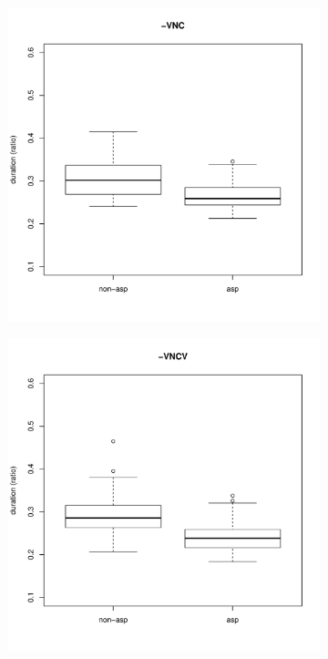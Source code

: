 \documentclass[11pt,a4paper,oneside,openany]{memoir}\usepackage[]{graphicx}\usepackage[]{color}
\newenvironment{knitrout}{}{} %
\begin{document}
\begin{figure}
\begin{subfigure}{.5\textwidth}
\begin{knitrout}
\end{knitrout}
\end{subfigure}
\begin{subfigure}{.5\textwidth}
\centering
\begin{knitrout}
\color{fgcolor}
\includegraphics[width=\textwidth]{img/mono-nas-box-1} 

\end{knitrout}
\end{subfigure}
\begin{subfigure}{.5\textwidth}
\centering
\begin{knitrout}
\color{fgcolor}
\includegraphics[width=\textwidth]{img/di-nas-box-1} 


\end{knitrout}
\end{subfigure}
\end{figure}
\end{document}
